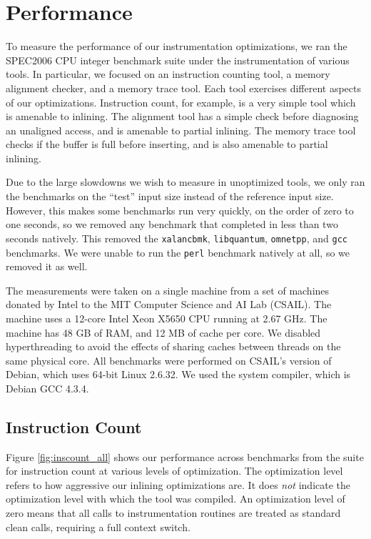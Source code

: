 \chapter{Performance}

To measure the performance of our instrumentation optimizations, we ran the
SPEC2006 CPU integer benchmark suite under the instrumentation of various tools.
In particular, we focused on an instruction counting tool, a memory alignment
checker, and a memory trace tool.  Each tool exercises different aspects of our
optimizations.  Instruction count, for example, is a very simple tool which is
amenable to inlining.  The alignment tool has a simple check before diagnosing
an unaligned access, and is amenable to partial inlining.  The memory trace tool
checks if the buffer is full before inserting, and is also amenable to partial
inlining.

Due to the large slowdowns we wish to measure in unoptimized tools, we only ran
the benchmarks on the ``test'' input size instead of the reference input size.
However, this makes some benchmarks run very quickly, on the order of zero to
one seconds, so we removed any benchmark that completed in less than two seconds
natively.  This removed the {\tt xalancbmk}, {\tt libquantum}, {\tt omnetpp},
and {\tt gcc} benchmarks.  We were unable to run the {\tt perl} benchmark
natively at all, so we removed it as well.

The measurements were taken on a single machine from a set of machines donated
by Intel to the MIT Computer Science and AI Lab (CSAIL).  The machine uses a
12-core Intel Xeon X5650 CPU running at 2.67 GHz.  The machine has 48 GB of RAM,
and 12 MB of cache per core.  We disabled hyperthreading to avoid the effects of
sharing caches between threads on the same physical core.  All benchmarks were
performed on CSAIL's version of Debian, which uses 64-bit Linux 2.6.32.  We used
the system compiler, which is Debian GCC 4.3.4.

\section{Instruction Count}

Figure \ref{fig:inscount_all} shows our performance across benchmarks from the
suite for instruction count at various levels of optimization.  The optimization
level refers to how aggressive our inlining optimizations are.  It does {\em not}
indicate the optimization level with which the tool was compiled.  An
optimization level of zero means that all calls to instrumentation routines are
treated as standard clean calls, requiring a full context switch.

